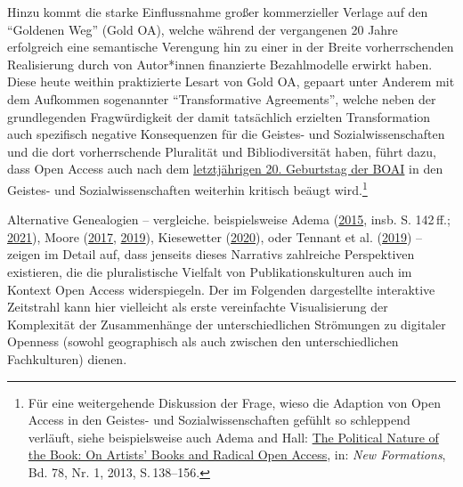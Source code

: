 \documentclass[a4paper,
fontsize=11pt,
oneside,
numbers=noperiodatend,
parskip=half-,
bibliography=totoc,
final
]{scrartcl}
\begin{document}
Hinzu kommt die starke Einflussnahme großer kommerzieller Verlage auf
den \enquote{Goldenen Weg} (Gold OA), welche während der vergangenen 20
Jahre erfolgreich eine semantische Verengung hin zu einer in der Breite
vorherrschenden Realisierung durch von Autor*innen finanzierte
Bezahlmodelle erwirkt haben. Diese heute weithin praktizierte Lesart von
Gold OA, gepaart unter Anderem mit dem Aufkommen sogenannter
\enquote{Transformative Agreements}, welche neben der grundlegenden
Fragwürdigkeit der damit tatsächlich erzielten Transformation auch
spezifisch negative Konsequenzen für die Geistes- und
Sozialwissenschaften und die dort vorherrschende Pluralität und
Bibliodiversität haben, führt dazu, dass Open Access auch nach dem
\href{https://www.budapestopenaccessinitiative.org/boai20/}{letztjährigen
20. Geburtstag der BOAI} in den Geistes- und Sozialwissenschaften
weiterhin kritisch beäugt wird.\footnote{Für eine weitergehende
  Diskussion der Frage, wieso die Adaption von Open Access in den
  Geistes- und Sozialwissenschaften gefühlt so schleppend verläuft,
  siehe beispielsweise auch Adema and Hall:
  \href{https://pureportal.coventry.ac.uk/en/publications/the-political-nature-of-the-book-on-artists-books-and-radical-ope-2}{The
  Political Nature of the Book: On Artists' Books and Radical Open
  Access}, in: \emph{New Formations}, Bd. 78, Nr. 1, 2013, S.\,138--156.}

Alternative Genealogien -- vergleiche. beispielsweise Adema
(\href{https://web.archive.org/web/20181102223636/https://curve.coventry.ac.uk/open/file/8222ccb2-f6b0-4e5f-90de-f4c62c77ac86/1/ademacomb.pdf}{2015},
insb. S. 142\,ff.;
\href{https://direct.mit.edu/books/oa-monograph/5179/Living-BooksExperiments-in-the-Posthumanities}{2021}),
Moore (\href{http://journals.openedition.org/rfsic/3220}{2017},
\href{https://doi.org/10.1002/asi.24306}{2019}), Kiesewetter
(\href{https://doi.org/10.5117/TVGN2020.2.001.KIES}{2020}), oder Tennant
et al. (\href{http://doi.org/10.31235/osf.io/2kxq8}{2019}) -- zeigen im
Detail auf, dass jenseits dieses Narrativs zahlreiche Perspektiven
existieren, die die pluralistische Vielfalt von Publikationskulturen
auch im Kontext Open Access widerspiegeln. Der im Folgenden dargestellte
interaktive Zeitstrahl kann hier vielleicht als erste vereinfachte
Visualisierung der Komplexität der Zusammenhänge der unterschiedlichen
Strömungen zu digitaler Openness (sowohl geographisch als auch zwischen
den unterschiedlichen Fachkulturen) dienen.
\end{document}
